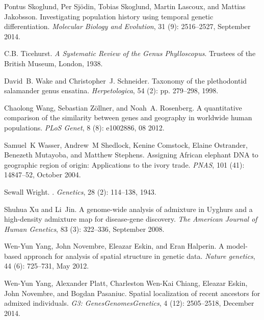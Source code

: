 \documentclass[10pt,letterpaper]{article}
\begin{document}
\begin{thebibliography}{80}
Pontus Skoglund, Per Sjödin, Tobias Skoglund, Martin Lascoux, and Mattias
  Jakobsson.
\newblock Investigating population history using temporal genetic
  differentiation.
\newblock \emph{Molecular Biology and Evolution}, 31 (9):
  2516--2527, September 2014.

C.B. Ticehurst.
\newblock \emph{A Systematic Review of the Genus Phylloscopus}.
\newblock Trustees of the British Museum, London, 1938.

David~B. Wake and Christopher~J. Schneider.
\newblock Taxonomy of the plethodontid salamander genus ensatina.
\newblock \emph{Herpetologica}, 54 (2): pp. 279--298, 1998.

Chaolong Wang, Sebastian Zöllner, and Noah~A. Rosenberg.
\newblock A quantitative comparison of the similarity between genes and
  geography in worldwide human populations.
\newblock \emph{PLoS Genet}, 8 (8): e1002886, 08 2012.

Samuel~K Wasser, Andrew~M Shedlock, Kenine Comstock, Elaine Ostrander, Benezeth
  Mutayoba, and Matthew Stephens.
\newblock Assigning {African} elephant {DNA} to geographic region of origin:
  {Applications} to the ivory trade.
\newblock \emph{PNAS}, 101 (41): 14847--52, October 2004.

Sewall Wright.
.
\newblock \emph{Genetics}, 28 (2): 114--138, 1943.

Shuhua Xu and Li~Jin.
\newblock A genome-wide analysis of admixture in {Uyghurs} and a high-density
  admixture map for disease-gene discovery.
\newblock \emph{The American Journal of Human Genetics}, 83
  (3): 322--336, September 2008.

Wen-Yun Yang, John Novembre, Eleazar Eskin, and Eran Halperin.
\newblock A model-based approach for analysis of spatial structure in genetic
  data.
\newblock \emph{Nature genetics}, 44 (6): 725--731, May 2012.

Wen-Yun Yang, Alexander Platt, Charleston Wen-Kai Chiang, Eleazar Eskin, John
  Novembre, and Bogdan Pasaniuc.
\newblock Spatial localization of recent ancestors for admixed individuals.
\newblock \emph{G3: Genes{\textbar}Genomes{\textbar}Genetics}, 4
  (12): 2505--2518, December 2014.

\end{thebibliography}
\end{document}
